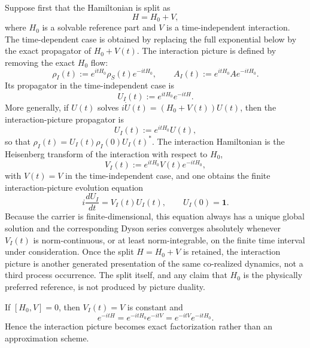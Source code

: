 \documentclass[12pt,a4paper]{article}
\begin{document}
Suppose first that the Hamiltonian is split as
\begin{equation}
\label{p4:eq:H-split}
H=H_0+V,
\end{equation}
where $H_0$ is a solvable reference part and $V$ is a time-independent interaction.  The time-dependent case is obtained by replacing the full exponential below by the exact propagator of $H_0+V(t)$.
The interaction picture is defined by removing the exact $H_0$ flow:
\begin{equation}
\label{p4:eq:interaction-picture-def}
\rho_I(t):=e^{itH_0}\rho_S(t)e^{-itH_0},
\qquad
A_I(t):=e^{itH_0}Ae^{-itH_0}.
\end{equation}
Its propagator in the time-independent case is
\begin{equation}
\label{p4:eq:UI-def}
U_I(t):=e^{itH_0}e^{-itH}.
\end{equation}
More generally, if $U(t)$ solves $i\dot U(t)=(H_0+V(t))U(t)$, then the interaction-picture propagator is
\[
U_I(t):=e^{itH_0}U(t),
\]
so that $\rho_I(t)=U_I(t)\rho_I(0)U_I(t)^*$.
The interaction Hamiltonian is the Heisenberg transform of the interaction with respect to $H_0$,
\begin{equation}
\label{p4:eq:VI-def}
V_I(t):=e^{itH_0}V(t)e^{-itH_0},
\end{equation}
with $V(t)=V$ in the time-independent case,
and one obtains the finite interaction-picture evolution equation
\begin{equation}
\label{p4:eq:UI-evolution}
i\frac{dU_I}{dt}=V_I(t)U_I(t),
\qquad
U_I(0)=\mathbf 1.
\end{equation}
Because the carrier is finite-dimensional, this equation always has a unique global solution and the corresponding Dyson series converges absolutely whenever $V_I(t)$ is norm-continuous, or at least norm-integrable, on the finite time interval under consideration.
Once the split \(H=H_0+V\) is retained, the interaction picture is another
generated presentation of the same co-realized dynamics, not a third process
occurrence.  The split itself, and any claim that \(H_0\) is the physically
preferred reference, is not produced by picture duality.

\begin{corollary}
\label{p4:cor:commuting-split}
If $[H_0,V]=0$, then $V_I(t)=V$ is constant and
\begin{equation}
\label{p4:eq:commuting-factorization}
e^{-itH}=e^{-itH_0}e^{-itV}=e^{-itV}e^{-itH_0}.
\end{equation}
Hence the interaction picture becomes exact factorization rather than an approximation scheme.
\end{corollary}
\end{document}
